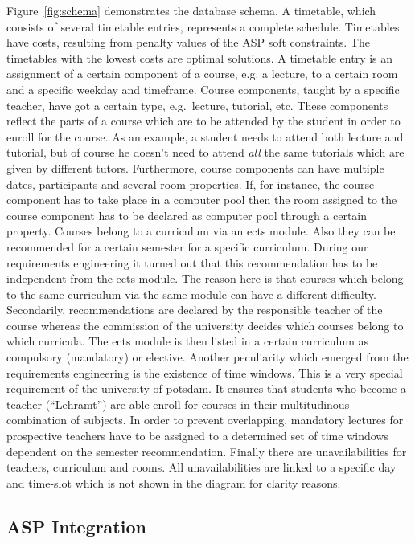 \documentclass[12pt]{article} %
\begin{document}
Figure~\ref{fig:schema} demonstrates the database schema.
A timetable, which consists of several timetable entries, represents a complete schedule.
Timetables have costs, resulting from penalty values of the ASP soft constraints.
The timetables with the lowest costs are optimal solutions.
A timetable entry is an assignment of a certain component of a course, e.g. a lecture, to a certain room and a specific weekday and timeframe.
Course components, taught by a specific teacher, have got a certain type, e.g.~lecture, tutorial, etc.
These components reflect the parts of a course which are to be attended by the student in order to enroll for the course.
As an example, a student needs to attend both lecture and tutorial, but of course he doesn't need to attend \emph{all} the same tutorials which are given by different tutors.
Furthermore, course components can have multiple dates, participants and several room properties.
If, for instance, the course component has to take place in a computer pool then the room assigned to the course component has to be declared as computer pool through a certain property.
Courses belong to a curriculum via an ects module.
Also they can be recommended for a certain semester for a specific curriculum.
During our requirements engineering it turned out that this recommendation has to be independent from the ects module.
The reason here is that courses which belong to the same curriculum via the same module can have a different difficulty.
Secondarily, recommendations are declared by the responsible teacher of the course whereas the commission of the university decides which courses belong to which curricula.
The ects module is then listed in a certain curriculum as compulsory (mandatory) or elective.
Another peculiarity which emerged from the requirements engineering is the existence of time windows.
This is a very special requirement of the university of potsdam.
It ensures that students who become a teacher (``Lehramt'') are able enroll for courses in their multitudinous combination of subjects.
In order to prevent overlapping, mandatory lectures for prospective teachers have to be assigned to a determined set of time windows dependent on the semester recommendation.
Finally there are unavailabilities for teachers, curriculum and rooms.
All unavailabilities are linked to a specific day and time-slot which is not shown in the diagram for clarity reasons.



\subsection{ASP Integration} 
\end{document}
